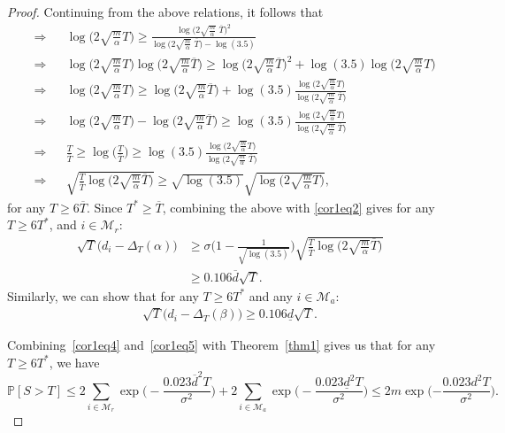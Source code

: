 \documentclass[12pt]{article}
\def\P{\mathbb{P}}
\def\MM{\mathcal{M}}
\def\d{\overline{d}}
\def\dd{\underline{d}}
\def\T{\overline{T}}
\begin{document}
\begin{proof}
Continuing from the above relations, it follows that
$$\begin{aligned}
&\Rightarrow &&  \log\bigg(2\sqrt{\frac{m}{\alpha}}T\bigg)\geq \frac{\log\bigg(2\sqrt{\frac{m}{\alpha}}\;\T\bigg)^2 }{\log\bigg(2\sqrt{\frac{m}{\alpha}}\;\T\bigg) - \log(3.5) }\\
&\Rightarrow &&  \log\bigg(2\sqrt{\frac{m}{\alpha}}T\bigg)\log\bigg(2\sqrt{\frac{m}{\alpha}}\T\bigg)\geq \log\bigg(2\sqrt{\frac{m}{\alpha}}\T\bigg)^2 + \log(3.5) \log\bigg(2\sqrt{\frac{m}{\alpha}}T\bigg)\\
&\Rightarrow &&  \log\bigg(2\sqrt{\frac{m}{\alpha}}T\bigg)\geq \log\bigg(2\sqrt{\frac{m}{\alpha}}\T\bigg) + \log(3.5)\frac{\log\bigg(2\sqrt{\frac{m}{\alpha}}T\bigg)}{\log\bigg(2\sqrt{\frac{m}{\alpha}}\;\T\bigg)}\\
&\Rightarrow &&  \log\bigg(2\sqrt{\frac{m}{\alpha}}T\bigg)-\log\bigg(2\sqrt{\frac{m}{\alpha}}\T\bigg)\geq \log(3.5)\frac{\log\bigg(2\sqrt{\frac{m}{\alpha}}T\bigg)}{\log\bigg(2\sqrt{\frac{m}{\alpha}}\;\T\bigg)}\\
&\Rightarrow && \frac{T}{\T}\geq \log\bigg(\frac{T}{\T}\bigg) \geq  \log(3.5)\frac{\log\bigg(2\sqrt{\frac{m}{\alpha}}T\bigg)}{\log\bigg(2\sqrt{\frac{m}{\alpha}}\;\T\bigg)}\\
&\Rightarrow &&  \sqrt{\frac{T}{\T}\log\bigg(2\sqrt{\frac{m}{\alpha}}\T\bigg)}\geq \sqrt{\log(3.5)} \sqrt{ \log\bigg(2\sqrt{\frac{m}{\alpha}}T\bigg)},
\end{aligned}$$
for any $T\geq 6\T$. Since $T^*\geq \T$, combining the above with  \eqref{cor1eq2} gives for any $T\geq 6T^*$, and $i\in\MM_r$:
\begin{equation}
\label{cor1eq4}
\begin{aligned}
\sqrt{T}\big(d_i - \Delta_T(\alpha)\big)& \geq \sigma \bigg(1 - \frac{1}{\sqrt{\log(3.5)}}\bigg) \sqrt{\frac{T}{\T}\log\bigg(2\sqrt{\frac{m}{\alpha}}\T\bigg)}\\
& \geq 0.106\d\sqrt{T}.
\end{aligned}
\end{equation}
 Similarly, we can show that for any $T\geq 6T^*$ and any $i\in\MM_a$:
\begin{equation}
\label{cor1eq5}
\begin{aligned}
\sqrt{T}\big(d_i - \Delta_T(\beta)\big)\geq 0.106\dd \sqrt{T}.
\end{aligned}
\end{equation}

\noindent
Combining~\eqref{cor1eq4} and~\eqref{cor1eq5} with Theorem~\ref{thm1} gives us that for any $T\geq 6T^*$, we have
$$\P[S>T]\leq 2\sum_{i\in\MM_r}\exp\Bigg(-\frac{0.023\d^2 T}{\sigma^2}\Bigg) + 2\sum_{i\in\MM_a}\exp\Bigg(-\frac{0.023\dd^2 T}{\sigma^2}\Bigg)\leq 2m \exp\Big({-\frac{0.023d^2 T}{\sigma^2}}\Big).$$
\end{proof}
\end{document}
